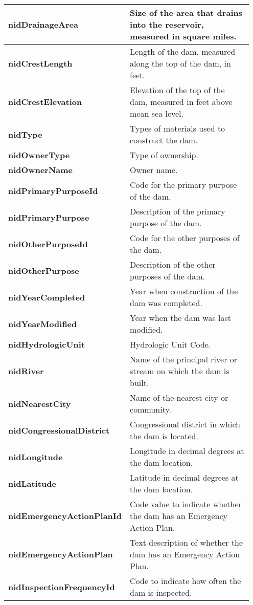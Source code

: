 \documentclass{article}
\begin{document}
\begin{longtable}{p{0.35\linewidth} p{0.6\linewidth}}
\textbf{nidDrainageArea} & Size of the area that drains into the reservoir, measured in square miles. \\\hline
\textbf{nidCrestLength} & Length of the dam, measured along the top of the dam, in feet. \\\hline
\textbf{nidCrestElevation} & Elevation of the top of the dam, measured in feet above mean sea level. \\\hline
\textbf{nidType} & Types of materials used to construct the dam. \\\hline
\textbf{nidOwnerType} & Type of ownership. \\\hline
\textbf{nidOwnerName} & Owner name. \\\hline
\textbf{nidPrimaryPurposeId} & Code for the primary purpose of the dam. \\\hline
\textbf{nidPrimaryPurpose} & Description of the primary purpose of the dam. \\\hline
\textbf{nidOtherPurposeId} & Code for the other purposes of the dam. \\\hline
\textbf{nidOtherPurpose} & Description of the other purposes of the dam. \\\hline
\textbf{nidYearCompleted} & Year when construction of the dam was completed. \\\hline
\textbf{nidYearModified} & Year when the dam was last modified. \\\hline
\textbf{nidHydrologicUnit} & Hydrologic Unit Code. \\\hline
\textbf{nidRiver} & Name of the principal river or stream on which the dam is built. \\\hline
\textbf{nidNearestCity} & Name of the nearest city or community. \\\hline
\textbf{nidCongressionalDistrict} & Congressional district in which the dam is located. \\\hline
\textbf{nidLongitude} & Longitude in decimal degrees at the dam location. \\\hline
\textbf{nidLatitude} & Latitude in decimal degrees at the dam location. \\\hline
\textbf{nidEmergencyActionPlanId} & Code value to indicate whether the dam has an Emergency Action Plan. \\\hline
\textbf{nidEmergencyActionPlan} & Text description of whether the dam has an Emergency Action Plan. \\\hline
\textbf{nidInspectionFrequencyId} & Code to indicate how often the dam is inspected. \\\hline

\end{longtable}
\end{document}
